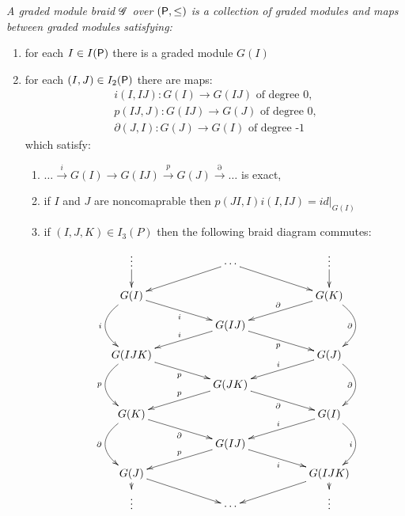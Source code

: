 \begin{defn}
{\em
A {\em graded module braid} $\mathscr{G}$ over $({\mathsf P},\leq)$ is a collection of graded modules and maps between graded modules satisfying:
\begin{enumerate}
\item for each $I\in I({\mathsf P})$ there is a graded module $G(I)$
\item for each $(I,J)\in I_2({\mathsf P})$ there are maps:
\begin{align*}
i(I,IJ)\colon G(I)\to G(IJ) \text{ of degree 0,}\\
p(IJ,J)\colon G(IJ)\to G(J) \text{ of degree 0,}\\
\partial(J,I)\colon G(J)\to G(I) \text{ of degree -1}
\end{align*}
which satisfy:
\begin{enumerate}
\item $\ldots \xrightarrow{i} G(I)\to G(IJ)\xrightarrow{p} G(J) \xrightarrow{\partial} \ldots$ is exact,
\item if $I$ and $J$ are noncomaprable then $p(JI,I)i(I,IJ)=id|_{G(I)}$
\item if $(I,J,K)\in I_3(P)$ then the following braid diagram commutes:
\begin{align}\label{dia:braid}
\xymatrixrowsep{0.15in}
\xymatrixcolsep{0.3in}
\xymatrix{
\vdots \ar@{->}[d] && \cdots \ar@{->}[drr] \ar@{->}[dll] && \vdots \ar@{->}[d]\\
G(I)\ar@/_2pc/[dd]_{i} \ar@{->}[drr]_{i} &&  && G(K)\ar@{->}[dll]_{\partial} \ar@/^2pc/[dd]_{\partial}  \\
& &G(IJ) \ar@{->}[dll]_{i} \ar@{->}[drr]_{p} &&\\
G(IJK) \ar@/_2pc/[dd]_{p}  \ar@{->}[drr]_{p} &&  && G(J)\ar@{->}[dll]_{i}  \ar@/^2pc/[dd]_{\partial}  \\
& &G(JK) \ar@{->}[dll]_{p} \ar@{->}[drr]_{\partial} &&\\
G(K)\ar@/_2pc/[dd]_{\partial}    \ar@{->}[drr]_{\partial} &&  && G(I)\ar@{->}[dll]_{i}   \ar@/^2pc/[dd]_{i} \\
& &G(IJ) \ar@{->}[dll]_{p} \ar@{->}[drr]_{i} &&\\
G(J)\ar@{->}[d] \ar@{->}[drr] &&  && G(IJK)\ar@{->}[dll]  \ar@{->}[d] \\
\vdots && \cdots && \vdots}
\end{align}
\end{enumerate}

\end{enumerate}
}
\end{defn}
